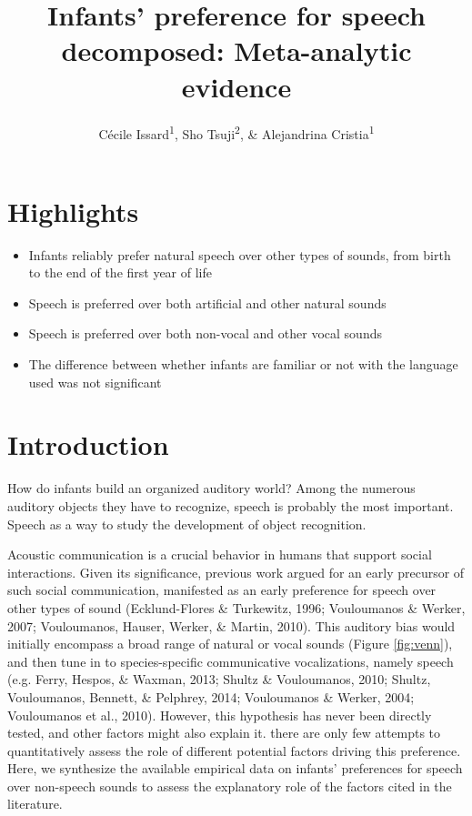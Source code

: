 \documentclass[man]{apa6}
\title{Infants' preference for speech decomposed: Meta-analytic evidence}
\author{Cécile Issard\textsuperscript{1}, Sho Tsuji\textsuperscript{2}, \&
Alejandrina Cristia\textsuperscript{1}}
\date{}
\affiliation{
\vspace{0.5cm}
\textsuperscript{1} Laboratoire de Sciences Cognitives et Psycholinguistique, Ecole Normale Supérieure, Département d'Études Cognitives\\\textsuperscript{2} International Research Center for Neurointelligence, The University of Tokyo}
\providecommand{\tightlist}{%
  \setlength{\itemsep}{0pt}\setlength{\parskip}{0pt}}
\begin{document}
\maketitle

\section{Highlights}\label{highlights}

\begin{itemize}
\tightlist
\item
  Infants reliably prefer natural speech over other types of sounds,
  from birth to the end of the first year of life
\item
  Speech is preferred over both artificial and other natural sounds
\item
  Speech is preferred over both non-vocal and other vocal sounds
\item
  The difference between whether infants are familiar or not with the
  language used was not significant
\end{itemize}

\section{Introduction}\label{introduction}

How do infants build an organized auditory world? Among the numerous
auditory objects they have to recognize, speech is probably the most
important. Speech as a way to study the development of object
recognition.

Acoustic communication is a crucial behavior in humans that support
social interactions. Given its significance, previous work argued for an
early precursor of such social communication, manifested as an early
preference for speech over other types of sound (Ecklund-Flores \&
Turkewitz, 1996; Vouloumanos \& Werker, 2007; Vouloumanos, Hauser,
Werker, \& Martin, 2010). This auditory bias would initially encompass a
broad range of natural or vocal sounds (Figure \ref{fig:venn}), and then
tune in to species-specific communicative vocalizations, namely speech
(e.g. Ferry, Hespos, \& Waxman, 2013; Shultz \& Vouloumanos, 2010;
Shultz, Vouloumanos, Bennett, \& Pelphrey, 2014; Vouloumanos \& Werker,
2004; Vouloumanos et al., 2010). However, this hypothesis has never been
directly tested, and other factors might also explain it. there are only
few attempts to quantitatively assess the role of different potential
factors driving this preference. Here, we synthesize the available
empirical data on infants' preferences for speech over non-speech sounds
to assess the explanatory role of the factors cited in the literature.
\end{document}
